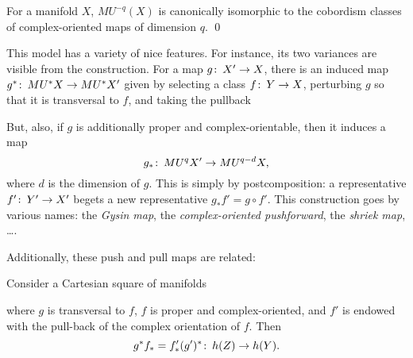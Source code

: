 \begin{theorem}[Thom]
For a manifold $X$, $MU^{-q}(X)$ is canonically isomorphic to the cobordism classes of complex-oriented maps of dimension $q$. \qed {}
\end{theorem}

\begin{remark}
This model has a variety of nice features.  For instance, its two variances are visible from the construction.  For a map $g\colon\thinspace X' \to X$, there is an induced map $g^*\colon\thinspace MU^* X \to MU^* X'$ given by selecting a class $f\colon\thinspace Y \to X$, perturbing $g$ so that it is transversal to $f$, and taking the pullback
\begin{center}
\end{center}
But, also, if $g$ is additionally proper and complex-orientable, then it induces a map \[g_*\colon\thinspace MU^q X' \to MU^{q-d} X,\] where $d$ is the dimension of $g$.  This is simply by postcomposition: a representative $f'\colon\thinspace Y' \to X'$ begets a new representative $g_* f' = g \circ f'$.  This construction goes by various names: the \textit{Gysin map}, the \textit{complex-oriented pushforward}, the \textit{shriek map}, \ldots.
\end{remark}

Additionally, these push and pull maps are related:
\begin{lemma}\label{PushPullFormulaForMU}
Consider a Cartesian square of manifolds
\begin{center}
\end{center}
where $g$ is transversal to $f$, $f$ is proper and complex-oriented, and $f'$ is endowed with the pull-back of the complex orientation of $f$. Then \[g^* f_* = f'_* (g')^*\co h(Z) \to h(Y). \qed\]
\end{lemma}


